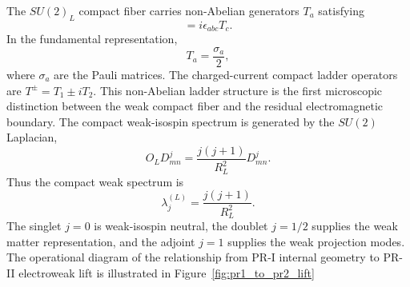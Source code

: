 \documentclass[11pt]{article}
\begin{document}
The \(SU(2)_L\) compact fiber carries non-Abelian generators \(T_a\) satisfying
\begin{equation}
[T_a,T_b]
=
i\epsilon_{abc}T_c.
\end{equation}
In the fundamental representation,
\begin{equation}
\boxed{
T_a
=
\frac{\sigma_a}{2},
}
\end{equation}
where \(\sigma_a\) are the Pauli matrices. 
The charged-current compact ladder operators are $T^\pm = T_1\pm iT_2$. This non-Abelian ladder structure is the first microscopic distinction between the weak compact fiber and the residual electromagnetic boundary. The compact weak-isospin spectrum is generated by the \(SU(2)\) Laplacian,
\begin{equation}
\boxed{
O_LD^j_{mn}
=
\frac{j(j+1)}{R_L^2}
D^j_{mn}.
}
\end{equation}
Thus the compact weak spectrum is
\begin{equation}
\boxed{
\lambda_j^{(L)}
=
\frac{j(j+1)}{R_L^2}.
}
\end{equation}
The singlet \(j=0\) is weak-isospin neutral, the doublet \(j=1/2\) supplies the weak matter representation, and the adjoint \(j=1\) supplies the weak projection modes. The operational diagram of the relationship from PR-I internal geometry to PR-II electroweak lift is illustrated in Figure~\ref{fig:pr1_to_pr2_lift}
\end{document}
